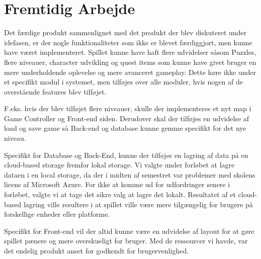 \section{Fremtidig Arbejde}
Det færdige produkt sammenlignet med det produkt der blev diskuteret under idefasen, er der nogle funktionaliteter som ikke er blevet færdiggjort, men kunne have været implementeret. Spillet kunne have haft flere udvidelser såsom Puzzles, flere niveauer, character udvikling og quest items som kunne have givet bruger en mere underholdende oplevelse og mere avanceret gameplay. Dette høre ikke under et specifikt modul i systemet, men tilføjes over alle moduler, hvis nogen af de overstående features blev tilføjet. 

F.eks. hvis der blev tilføjet flere niveauer, skulle der implementeres et nyt map i Game Controller og Front-end siden. Derudover skal der tilføjes en udvidelse af load og save game så Back-end og database kunne gemme specifikt for det nye niveau.

Specifikt for Database og Back-End, kunne der tilføjes en lagring af data på en cloud-based storage fremfor lokal storage. Vi valgte under forløbet at lagre dataen i en local storage, da der i midten af semestret var problemer med skolens licens af Microsoft Azure. For ikke at komme ud for udfordringer senere i forløbet, valgte vi at tage det sikre valg at lagre det lokalt. Resultatet af et cloud-based lagring ville resultere i at spillet ville være mere tilgængelig for brugere på forskellige enheder eller platforme. 

Specifikt for Front-end vil der altid kunne være en udvidelse af layout for at gøre spillet pænere og mere overskueligt for bruger. Med de ressourcer vi havde, var det endelig produkt anset for godkendt for brugervenlighed.